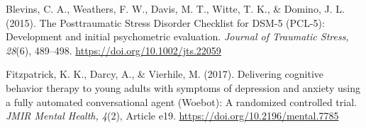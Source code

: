 \documentclass[11pt,a4paper]{article}
\begin{document}
{\setlength{\parindent}{0pt}
\setlength{\parskip}{5pt}
\hangindent=1.27cm
Blevins, C. A., Weathers, F. W., Davis, M. T., Witte, T. K., \& Domino, J. L. (2015). The Posttraumatic Stress Disorder Checklist for DSM-5 (PCL-5): Development and initial psychometric evaluation. \textit{Journal of Traumatic Stress, 28}(6), 489--498. \url{https://doi.org/10.1002/jts.22059}\par
\hangindent=1.27cm
Fitzpatrick, K. K., Darcy, A., \& Vierhile, M. (2017). Delivering cognitive behavior therapy to young adults with symptoms of depression and anxiety using a fully automated conversational agent (Woebot): A randomized controlled trial. \textit{JMIR Mental Health, 4}(2), Article e19. \url{https://doi.org/10.2196/mental.7785}\par
}
\end{document}
